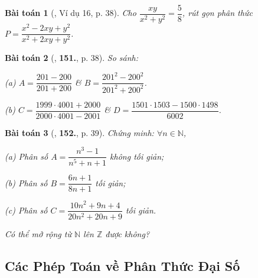 \documentclass{article}
\numberwithin{equation}{section}
\newtheorem{baitoan}{Bài toán}[section]
\begin{document}
\begin{baitoan}[\cite{Tuyen_Toan_8}, Ví dụ 16, p. 38]
	Cho $\dfrac{xy}{x^2 + y^2} = \dfrac{5}{8}$, rút gọn phân thức $P = \dfrac{x^2 - 2xy + y^2}{x^2 + 2xy + y^2}$.
\end{baitoan}

\begin{baitoan}[\cite{Tuyen_Toan_8}, \textbf{151.}, p. 38]
	So sánh:
	\begin{enumerate*}
		\item[(a)] $A = \dfrac{201 - 200}{201 + 200}$ \& $B = \dfrac{201^2 - 200^2}{201^2 + 200^2}$.
		\item[(b)] $C = \dfrac{1999\cdot 4001 + 2000}{2000\cdot 4001 - 2001}$ \& $D = \dfrac{1501\cdot 1503 - 1500\cdot 1498}{6002}$.
	\end{enumerate*}
\end{baitoan}

\begin{baitoan}[\cite{Tuyen_Toan_8}, \textbf{152.}, p. 39]
	Chứng minh: $\forall n\in\mathbb{N}$,
	\begin{enumerate*}
		\item[(a)] Phân số $A = \dfrac{n^3 - 1}{n^5 + n + 1}$ không tối giản;
		\item[(b)] Phân số $B = \dfrac{6n + 1}{8n + 1}$ tối giản;
		\item[(c)] Phân số $C = \dfrac{10n^2 + 9n + 4}{20n^2 + 20n + 9}$ tối giản.
	\end{enumerate*}
	Có thể mở rộng từ $\mathbb{N}$ lên $\mathbb{Z}$ được không?
\end{baitoan}


\subsection{Các Phép Toán về Phân Thức Đại Số}


\printbibliography[heading=bibintoc]
	
\end{document}
